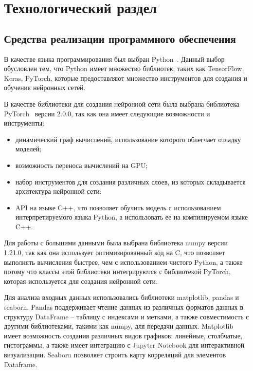 \chapter{Технологический раздел}

\section{Средства реализации программного обеспечения}

В качестве языка программирования был выбран Python~\cite{Python}. Данный выбор обусловлен тем, что Python имеет множество библиотек, таких как TensorFlow, Keras, PyTorch, которые предоставляют множество инструментов для создания и обучения нейронных сетей.

В качестве библиотеки для создания нейронной сети была выбрана библиотека PyTorch~\cite{PyTorch} версии 2.0.0, так как она имеет следующие возможности и инструменты:
\begin{itemize}
	\item динамический граф вычислений, использование которого облегчает отладку моделей;
	\item возможность переноса вычислений на GPU;
	\item набор инструментов для создания различных слоев, из которых складывается архитектура нейронной сети;
	\item API на языке C++, что позволяет обучить модель с использованием интерпретируемого языка Python, а использовать ее на компилируемом языке C++.
\end{itemize}

Для работы с большими данными была выбрана библиотека numpy версии 1.21.0, так как она использует оптимизированный код на C, что позволяет выполнять вычисления быстрее, чем с использованием чистого Python, а также потому что классы этой библиотеки интегрируются с библиотекой PyTorch, которая используется для создания нейронной сети.

Для анализа входных данных использовались библиотеки matplotlib, pandas и seaborn.
Pandas поддерживает чтение данных из различных форматов данных в структуру DataFrame -- таблицу с индексами и метками, а также совместимость с другими библиотеками, такими как numpy, для передачи данных.
Matplotlib имеет возможность создания различных видов графиков: линейные, столбчатые, гистограммы, а также имеет интеграцию с Jupyter Notebook для интерактивной визуализации.
Seaborn позволяет строить карту корреляций для элементов Dataframe.

